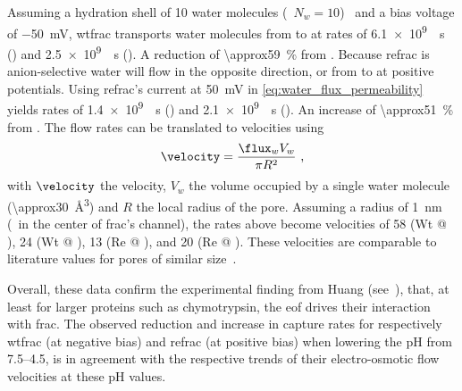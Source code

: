 Assuming a hydration shell of 10 water molecules (\ie~$N_{w} = 10$)~\cite{Boukhet-2016,Piguet-2014} and a bias
voltage of \SI{-50}{\mV}, \gls{wtfrac} transports water molecules from \cisi{} to \transi{} at rates of
\SI{6.1e9}{\per\second} () and \SI{2.5e9}{\per\second} (). A reduction of
\SI{\approx59}{\percent} from . Because \Gls{refrac} is anion-selective water will flow in
the opposite direction, or from \cisi{} to \transi{} at positive potentials. Using \gls{refrac}'s current at
\SI{+50}{\mV} in \cref{eq:water_flux_permeability} yields rates of \SI{1.4e9}{\per\second} () and
\SI{2.1e9}{\per\second} (). An increase of \SI{\approx51}{\percent} from . The flow
rates can be translated to velocities using
%
\begin{equation}\label{eq:water_flux_to_velocity}
  \velocity = \dfrac{\flux_{w} V_{w}}{\pi R^2}
  \text{ ,}
\end{equation}
%
with $\velocity$ the velocity, $V_{w}$ the volume occupied by a single water molecule
(\SI{\approx30}{\cubic\angstrom}) and $R$ the local radius of the pore. Assuming a radius of \SI{1}{\nm}
(\eg~in the center of \gls{frac}'s channel), the rates above become velocities of \SI{58}{\mmps} (Wt @
), \SI{24}{\mmps} (Wt @ ), \SI{13}{\mmps} (Re @ ), and \SI{20}{\mmps} (Re @ ).
These velocities are comparable to literature values for pores of similar
size~\cite{Boukhet-2016,Piguet-2014,Pederson-2015}.

Overall, these data confirm the experimental finding from Huang \etal{} (see~\cite{Huang-2017}), that, at
least for larger proteins such as chymotrypsin, the \gls{eof} drives their interaction with \gls{frac}. The
observed reduction and increase in capture rates for respectively \gls{wtfrac} (at negative bias) and
\gls{refrac} (at positive bias) when lowering the pH from \numrange{7.5}{4.5}, is in agreement with the
respective trends of their electro-osmotic flow velocities at these pH values.



